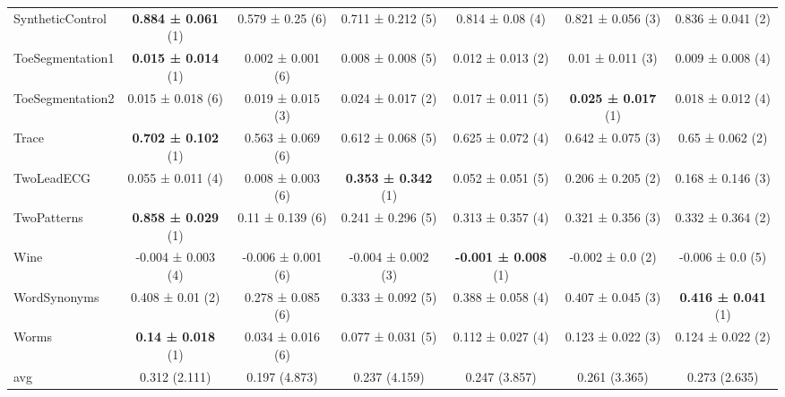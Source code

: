 \begin{table}[ht]
\begin{adjustbox}{width=\textwidth}
\begin{tabular}{lcccccc}
    SyntheticControl & \textbf{0.884 ± 0.061} (1) & 0.579 ± 0.25 (6) & 0.711 ± 0.212 (5) & 0.814 ± 0.08 (4) & 0.821 ± 0.056 (3) & 0.836 ± 0.041 (2) \\
    ToeSegmentation1 & \textbf{0.015 ± 0.014} (1) & 0.002 ± 0.001 (6) & 0.008 ± 0.008 (5) & 0.012 ± 0.013 (2) & 0.01 ± 0.011 (3) & 0.009 ± 0.008 (4) \\
    ToeSegmentation2 & 0.015 ± 0.018 (6) & 0.019 ± 0.015 (3) & 0.024 ± 0.017 (2) & 0.017 ± 0.011 (5) & \textbf{0.025 ± 0.017} (1) & 0.018 ± 0.012 (4) \\
    Trace & \textbf{0.702 ± 0.102} (1) & 0.563 ± 0.069 (6) & 0.612 ± 0.068 (5) & 0.625 ± 0.072 (4) & 0.642 ± 0.075 (3) & 0.65 ± 0.062 (2) \\
    TwoLeadECG & 0.055 ± 0.011 (4) & 0.008 ± 0.003 (6) & \textbf{0.353 ± 0.342} (1) & 0.052 ± 0.051 (5) & 0.206 ± 0.205 (2) & 0.168 ± 0.146 (3) \\
    TwoPatterns & \textbf{0.858 ± 0.029} (1) & 0.11 ± 0.139 (6) & 0.241 ± 0.296 (5) & 0.313 ± 0.357 (4) & 0.321 ± 0.356 (3) & 0.332 ± 0.364 (2) \\
    Wine & -0.004 ± 0.003 (4) & -0.006 ± 0.001 (6) & -0.004 ± 0.002 (3) & \textbf{-0.001 ± 0.008} (1) & -0.002 ± 0.0 (2) & -0.006 ± 0.0 (5) \\
    WordSynonyms & 0.408 ± 0.01 (2) & 0.278 ± 0.085 (6) & 0.333 ± 0.092 (5) & 0.388 ± 0.058 (4) & 0.407 ± 0.045 (3) & \textbf{0.416 ± 0.041} (1) \\
    Worms & \textbf{0.14 ± 0.018} (1) & 0.034 ± 0.016 (6) & 0.077 ± 0.031 (5) & 0.112 ± 0.027 (4) & 0.123 ± 0.022 (3) & 0.124 ± 0.022 (2) \\
    \hline 
    avg & 0.312 (2.111) & 0.197 (4.873) & 0.237 (4.159) & 0.247 (3.857) & 0.261 (3.365) & 0.273 (2.635) \\ 
    \hline
    \end{tabular}
    \end{adjustbox}
    \end{table}
    
    
    

